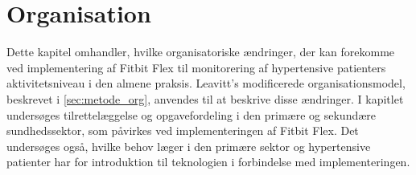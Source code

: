 \chapter{Organisation}
Dette kapitel omhandler, hvilke organisatoriske ændringer, der kan forekomme ved implementering af Fitbit Flex til monitorering af hypertensive patienters aktivitetsniveau i den almene praksis. Leavitt's modificerede organisationsmodel, beskrevet i \autoref{sec:metode_org}, anvendes til at beskrive disse ændringer. I kapitlet undersøges tilrettelæggelse og opgavefordeling i den primære og sekundære sundhedssektor, som påvirkes ved implementeringen af Fitbit Flex. Det undersøges også, hvilke behov læger i den primære sektor og hypertensive patienter har for introduktion til teknologien i forbindelse med implementeringen.   

